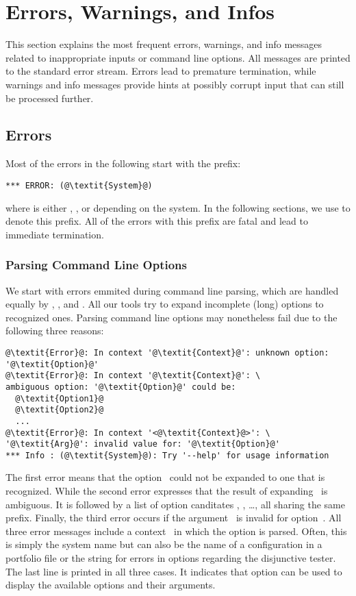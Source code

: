 \section{Errors, Warnings, and Infos}\label{sec:errorwarn}

This section explains the most frequent errors, warnings, and info messages
related to inappropriate inputs or command line options.
All messages are printed to the standard error stream.
Errors lead to premature termination,
while warnings and info messages provide hints at possibly corrupt input that can still be processed further.

\subsection{Errors}\label{sec:error}

Most of the errors in the following start with the prefix:
\begin{lstlisting}[numbers=none,escapechar=@]
*** ERROR: (@\textit{System}@)
\end{lstlisting}
where  is either , , or  depending on the system.
In the following sections, we use  to denote this prefix.
All of the errors with this prefix are fatal and lead to immediate termination.

\subsubsection{Parsing Command Line Options}\label{subsec:error:options}

We start with errors emmited during command line parsing,
which are handled equally by \gringo, \clasp, and \clingo.
All our tools try to expand incomplete (long) options to recognized ones.
Parsing command line options may nonetheless fail due to the following three reasons:
%
\begin{lstlisting}[numbers=none,escapechar=@]
@\textit{Error}@: In context '@\textit{Context}@': unknown option: '@\textit{Option}@'
@\textit{Error}@: In context '@\textit{Context}@': \
ambiguous option: '@\textit{Option}@' could be:
  @\textit{Option1}@
  @\textit{Option2}@
  ...
@\textit{Error}@: In context '<@\textit{Context}@>': \
'@\textit{Arg}@': invalid value for: '@\textit{Option}@'
*** Info : (@\textit{System}@): Try '--help' for usage information
\end{lstlisting}
%
The first error means that the option~
could not be expanded to one that is recognized.
While the second error expresses that the result of expanding~ is ambiguous.
It is followed by a list of option canditates , , \dots, all sharing the same prefix.
Finally, the third error occurs if the argument~\codeit{Arg} is invalid for option~.
All three error messages include a context~\codeit{Context} in which the option is parsed.
Often, this is simply the system name 
but can also be the name of a configuration in a portfolio file
or the string \code{tester} for errors in options regarding the disjunctive tester.
The last line is printed in all three cases.
It indicates that option \code{--help} can be used to display the available options and their arguments.

